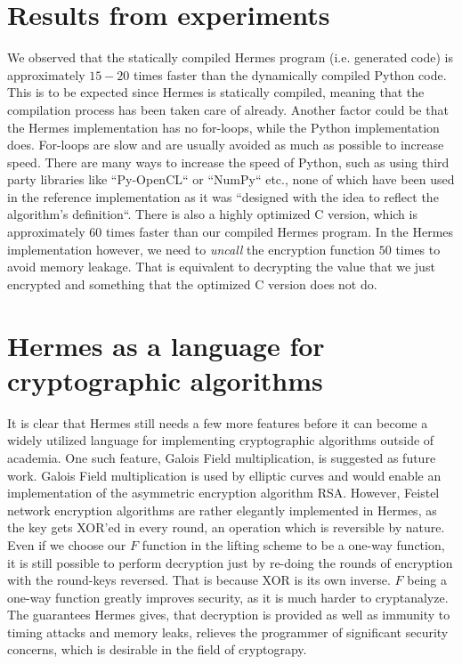 \section{Results from experiments}
We observed that the statically compiled Hermes program (i.e. generated code) is approximately $15-20$ times faster than the dynamically compiled Python code.
This is to be expected since Hermes is statically compiled, meaning that the compilation process has been taken care of already.
Another factor could be that the Hermes implementation has no for-loops, while the Python implementation does.
For-loops are slow and are usually avoided as much as possible to increase speed.
There are many ways to increase the speed of Python, such as using third party libraries like ``Py-OpenCL`` or ``NumPy`` etc., none of which have been used in the reference implementation as it was ``designed with the idea to reflect the algorithm's definition``\cite{GIT2F}.  
There is also a highly optimized C version\cite{GIT2F}, which is approximately $60$ times faster than our compiled Hermes program.
In the Hermes implementation however, we need to \emph{uncall} the encryption function $50$ times to avoid memory leakage.
That is equivalent to decrypting the value that we just encrypted and something that the optimized C version does not do.

\section{Hermes as a language for cryptographic algorithms}
It is clear that Hermes still needs a few more features before it can become a widely utilized language for implementing cryptographic algorithms outside of academia.
One such feature, Galois Field multiplication, is suggested as future work.
Galois Field multiplication is used by elliptic curves and would enable an implementation of the asymmetric encryption algorithm RSA.
However, Feistel network encryption algorithms are rather elegantly implemented in Hermes, as the key gets XOR'ed in every round, an operation which is reversible by nature.
Even if we choose our $F$ function in the lifting scheme to be a one-way function, it is still possible to perform decryption just by re-doing the rounds of encryption with the round-keys reversed. That is because XOR is its own inverse. $F$ being a one-way function greatly improves security, as it is much harder to cryptanalyze.
The guarantees Hermes gives, that decryption is provided as well as immunity to timing attacks and memory leaks, relieves the programmer of significant security concerns, which is desirable in the field of cryptograpy.

